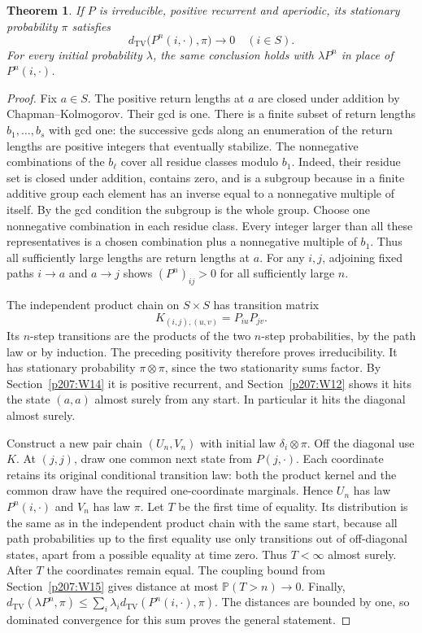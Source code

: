 \documentclass[11pt,oneside,openany]{book}
\theoremstyle{plain}
\newtheorem{theorem}{Theorem}[chapter]
\theoremstyle{definition}
\theoremstyle{remark}
\begin{document}
\begin{theorem}
If \(P\) is irreducible, positive recurrent and aperiodic, its
stationary probability \(\pi\) satisfies
\[
 d_{\mathrm{TV}}\big(P^n(i,\cdot),\pi\big)\longrightarrow 0
 \quad (i\in S).
\]
For every initial probability \(\lambda\), the same conclusion
holds with \(\lambda P^n\) in place of \(P^n(i,\cdot)\).
\end{theorem}
\begin{proof}
Fix \(a\in S\). The positive return lengths at \(a\) are closed
under addition by Chapman--Kolmogorov. Their gcd is one.
There is a finite subset of return lengths \(b_1,\ldots,b_s\)
with gcd one: the successive gcds along an enumeration of the
return lengths are positive integers that eventually stabilize.
The nonnegative combinations of the \(b_\ell\) cover all residue
classes modulo \(b_1\). Indeed, their residue set is closed under
addition, contains zero, and is a subgroup because in a finite
additive group each element has an inverse equal to a nonnegative
multiple of itself. By the gcd condition the subgroup is the
whole group. Choose one nonnegative combination in each residue
class. Every integer larger than all these representatives is
a chosen combination plus a nonnegative multiple of \(b_1\).
Thus all sufficiently large lengths are return lengths at \(a\).
For any \(i,j\), adjoining fixed paths \(i\to a\) and \(a\to j\)
shows \((P^n)_{ij}>0\) for all sufficiently large \(n\).

The independent product chain on \(S\times S\) has transition
matrix
\[
 K_{(i,j),(u,v)}=P_{iu}P_{jv}.
\]
Its \(n\)-step transitions are the products of the two
\(n\)-step probabilities, by the path law or by induction.
The preceding positivity therefore proves irreducibility.
It has stationary probability \(\pi\otimes\pi\), since the two
stationarity sums factor. By Section~\ref{p207:W14} it is positive
recurrent, and Section~\ref{p207:W12} shows it hits the state
\((a,a)\) almost surely from any start. In particular it hits
the diagonal almost surely.

Construct a new pair chain \((U_n,V_n)\) with initial law
\(\delta_i\otimes\pi\). Off the diagonal use \(K\).
At \((j,j)\), draw one common next state from \(P(j,\cdot)\).
Each coordinate retains its original conditional transition law:
both the product kernel and the common draw have the required
one-coordinate marginals. Hence \(U_n\) has law \(P^n(i,\cdot)\)
and \(V_n\) has law \(\pi\).
Let \(T\) be the first time of equality. Its distribution is
the same as in the independent product chain with the same
start, because all path probabilities up to the first equality
use only transitions out of off-diagonal states, apart from a
possible equality at time zero. Thus \(T<\infty\) almost surely.
After \(T\) the coordinates remain equal. The coupling bound
from Section~\ref{p207:W15} gives distance at most
\(\mathbb P(T>n)\to0\).
Finally,
\(d_{\mathrm{TV}}(\lambda P^n,\pi)
\le\sum_i\lambda_i d_{\mathrm{TV}}(P^n(i,\cdot),\pi)\).
The distances are bounded by one, so dominated convergence
for this sum proves the general statement.
\end{proof}
\end{document}
